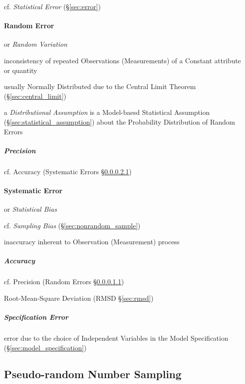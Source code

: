 cf. \emph{Statistical Error} (\S\ref{sec:error})



\paragraph{Random Error}\label{sec:random_error}\hfill

or \emph{Random Variation}

inconsistency of repeated Observations (Measurements) of a Constant attribute or
quantity

usually Normally Distributed due to the Central Limit Theorem
(\S\ref{sec:central_limit})

\fist a \emph{Distributional Assumption} is a Model-baesd Statistical Assumption
(\S\ref{sec:statistical_assumption}) about the Probability Distribution of
Random Errors



\subparagraph{Precision}\label{sec:precision}\hfill

cf. Accuracy (Systematic Errors \S\ref{sec:accuracy})



\paragraph{Systematic Error}\label{sec:systematic_error}\hfill

or \emph{Statistical Bias}

cf. \emph{Sampling Bias} (\S\ref{sec:nonrandom_sample})

inaccuracy inherent to Observation (Measurement) process



\subparagraph{Accuracy}\label{sec:accuracy}\hfill

cf. Precision (Random Errors \S\ref{sec:precision})

\fist Root-Mean-Square Deviation (RMSD \S\ref{sec:rmsd})



\subparagraph{Specification Error}\label{sec:specification_error}\hfill


error due to the choice of Independent Variables in the Model Specification
(\S\ref{sec:model_specification})



\subsection{Pseudo-random Number Sampling}\label{sec:pseudorandom_sampling}

